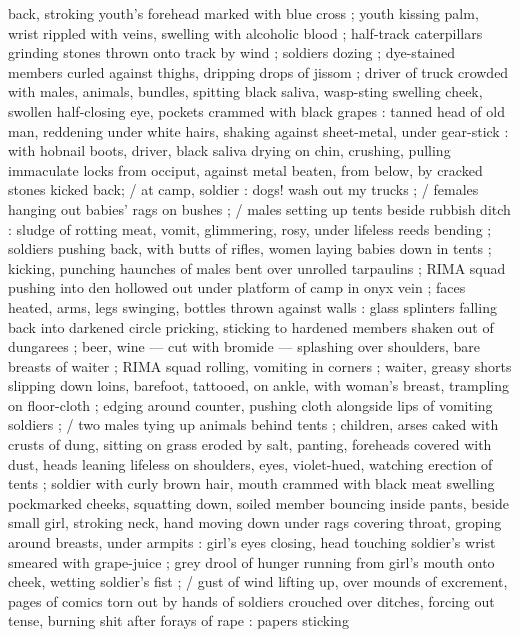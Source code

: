 \documentclass[10pt,twoside]{memoir}
\begin{document}
back, stroking youth's forehead marked with blue cross ; youth 
kissing palm, wrist rippled with veins, swelling with alcoholic blood ; 
half-track caterpillars grinding stones thrown onto track by wind ;
soldiers dozing ; dye-stained members curled against thighs,
dripping drops of jissom ; driver of truck crowded with males, 
animals, bundles, spitting black saliva, wasp-sting swelling cheek,
swollen half-closing eye, pockets crammed with black grapes : 
tanned head of old man, reddening under white hairs, shaking 
against sheet-metal, under gear-stick : with hobnail boots, driver,
black saliva drying on chin, crushing, pulling immaculate locks from 
occiput, against metal beaten, from below, by cracked stones kicked 
back; / at camp, soldier : {\guillemotleft} dogs! wash out my trucks {\guillemotright} ; / females 
hanging out babies' rags on bushes ; / males setting up tents beside
rubbish ditch : sludge of rotting meat, vomit, glimmering, rosy, under
lifeless reeds bending ; soldiers pushing back, with butts of rifles, 
women laying babies down in tents ; kicking, punching haunches of
males bent over unrolled tarpaulins ; RIMA squad pushing into den 
hollowed out under platform of camp in onyx vein ; faces heated, 
arms, legs swinging, bottles thrown against walls : glass splinters 
falling back into darkened circle pricking, sticking to hardened 
members shaken out of dungarees ; beer, wine --- cut with bromide 
--- splashing over shoulders, bare breasts of waiter ; RIMA squad 
rolling, vomiting in corners ; waiter, greasy shorts slipping down 
loins, barefoot, tattooed, on ankle, with woman's breast, trampling
on floor-cloth ; edging around counter, pushing cloth alongside lips 
of vomiting soldiers ; / two males tying up animals behind tents ; 
children, arses caked with crusts of dung, sitting on grass eroded by 
salt, panting, foreheads covered with dust, heads leaning lifeless on 
shoulders, eyes, violet-hued, watching erection of tents ; soldier with 
curly brown hair, mouth crammed with black meat swelling pockmarked 
cheeks, squatting down, soiled member bouncing inside 
pants, beside small girl, stroking neck, hand moving down under rags 
covering throat, groping around breasts, under armpits : girl's eyes 
closing, head touching soldier's wrist smeared with grape-juice ; grey 
drool of hunger running from girl's mouth onto cheek, wetting 
soldier's fist ; / gust of wind lifting up, over mounds of excrement, 
pages of comics torn out by hands of soldiers crouched over ditches, 
forcing out tense, burning shit after forays of rape : papers sticking 
\end{document}
